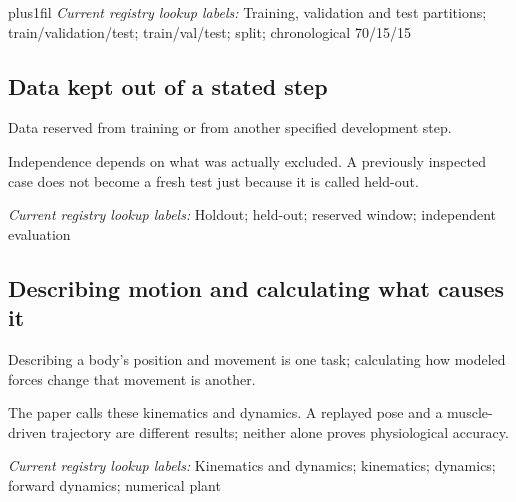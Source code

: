 {\rightskip=0pt plus1fil\relax
\noindent\textit{Current registry lookup labels:} Training, validation and test partitions; train/validation/test; train/val/test; split; chronological 70/15/15\par
}

\begin{samepage}
\subsection*{Data kept out of a stated step}
\noindent Data reserved from training or from another specified development step.\par
\end{samepage}
\begin{samepage}
\noindent Independence depends on what was actually excluded. A previously inspected case does not become a fresh test just because it is called held-out.\par\nopagebreak[4]

\end{samepage}


\noindent\textit{Current registry lookup labels:} Holdout; held-out; reserved window; independent evaluation\par

\begin{samepage}
\subsection*{Describing motion and calculating what causes it}
\noindent Describing a body’s position and movement is one task; calculating how modeled forces change that movement is another.\par
\end{samepage}
\begin{samepage}
\noindent The paper calls these kinematics and dynamics. A replayed pose and a muscle-driven trajectory are different results; neither alone proves physiological accuracy.\par\nopagebreak[4]

\end{samepage}


\noindent\textit{Current registry lookup labels:} Kinematics and dynamics; kinematics; dynamics; forward dynamics; numerical plant\par


